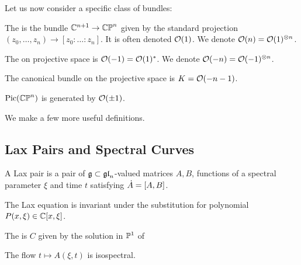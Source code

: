 \documentclass{article}
\begin{document}
Let us now consider a specific class of bundles: 

\begin{definition}
	The  is the bundle $\mbb{C}^{n+1} \to \mbb{CP}^n$ given by the standard projection $(z_0, \dots, z_n) \to [z_0: \dots : z_n]$. It is often denoted $\mc{O}(1)$.  We denote $\mc{O}(n) = \mc{O}(1)^{\otimes n}$.
\end{definition}



\begin{definition}
	The  on projective space is $\mc{O}(-1) = \mc{O}(1)^\ast$. We denote $\mc{O}(-n) = \mc{O}(-1)^{\otimes n}$. 
\end{definition}

\begin{prop}
	The canonical bundle on the projective space is $K = \mc{O}(-n-1)$. 
\end{prop}
\begin{prop}
	$\Pic(\mbb{CP}^n)$ is generated by $\mc{O}(\pm1)$.  
\end{prop}

We make a few more useful definitions. 

\subsection{Lax Pairs and Spectral Curves}
\begin{definition}
	A Lax pair is a pair of $\mf{g}\subset\mf{gl}_n$-valued matrices $A,B$, functions of a spectral parameter $\xi$ and time $t$ satisfying $\dot{A} = \comm[A]{B}$. 
\end{definition}

\begin{prop}
	The Lax equation is invariant under the substitution 
for polynomial $P(x,\xi) \in \mbb{C}[x,\xi]$. 
\end{prop}

\begin{definition}
	The  is $C$ given by the solution in $\mbb{P}^1$ of 
\end{definition}

\begin{prop}
	The flow $t \mapsto A(\xi,t)$ is isospectral.
\end{prop}
\end{document}
